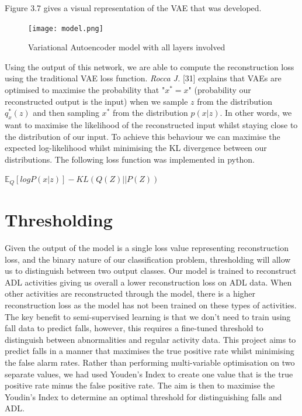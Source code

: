 Figure 3.7 gives a visual representation of the VAE that was developed. 

\begin{figure}[H]
    \centering
    \texttt{[image: model.png]}
    \caption{Variational Autoencoder model with all layers involved}
    \label{fig:my_label}
\end{figure}

Using the output of this network, we are able to compute the reconstruction loss using the traditional VAE loss function. \textit{Rocca J.} [31] explains that VAEs are optimised to maximise the probability that "$x^{*} = x$" (probability our reconstructed output is the input) when we sample $z$ from the distribution $q^{*}_{x}(z)$ and then sampling $x^{*}$ from the distribution $p(x|z)$. In other words, we want to maximise the likelihood of the reconstructed input whilst staying close to the distribution of our input. To achieve this behaviour we can maximise the expected log-likelihood whilst minimising the KL divergence between our distributions. The following loss function was implemented in python.
\begin{center}$\mathbb{E}_{Q}[logP(x|z)] - KL(Q(Z)||P(Z)) $\end{center}

\section{Thresholding}
Given the output of the model is a single loss value representing reconstruction loss, and the binary nature of our classification problem, thresholding will allow us to distinguish between two output classes. Our model is trained to reconstruct ADL activities giving us overall a lower reconstruction loss on ADL data. When other activities are reconstructed through the model, there is a higher reconstruction loss as the model has not been trained on these types of activities. The key benefit to semi-supervised learning is that we don't need to train using fall data to predict falls, however, this requires a fine-tuned threshold to distinguish between abnormalities and regular activity data. This project aims to predict falls in a manner that maximises the true positive rate whilst minimising the false alarm rates. Rather than performing multi-variable optimisation on two separate values, we had used Youden's Index to create one value that is the true positive rate minus the false positive rate. The aim is then to maximise the Youdin's Index to determine an optimal threshold for distinguishing falls and ADL.

